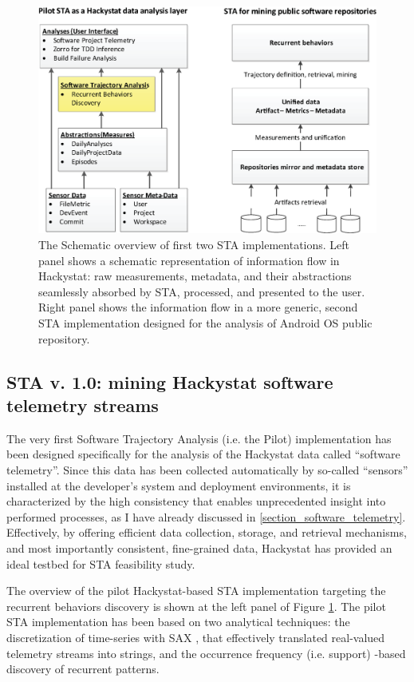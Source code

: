 \begin{figure}[t]
   \centering
   \includegraphics[width=150mm]{figures/STA12-schema-draft.eps}
   \caption{The Schematic overview of first two STA implementations. 
   Left panel shows a schematic representation of information flow in Hackystat: raw measurements, metadata, 
   and their abstractions seamlessly absorbed by STA, processed, and presented to the user.
   Right panel shows the information flow in a more generic, second STA implementation designed for the 
   analysis of Android OS public repository.}
   \label{fig:STA12-schema}
\end{figure}

\subsection{STA v. 1.0: mining Hackystat software telemetry streams}
The very first Software Trajectory Analysis (i.e. the Pilot) implementation has been designed specifically for the analysis 
of the Hackystat data called ``software telemetry''. Since this data has been collected automatically by so-called 
``sensors'' installed at the developer's system and deployment environments, it is characterized by the high consistency  
that enables unprecedented insight into performed processes, as I have already discussed in \ref{section_software_telemetry}. 
Effectively, by offering efficient data collection, storage, and retrieval mechanisms, and most importantly consistent, 
fine-grained data, Hackystat has provided an ideal testbed for STA feasibility study.

The overview of the pilot Hackystat-based STA implementation targeting the recurrent behaviors discovery is shown 
at the left panel of Figure  \ref{fig:STA12-schema}.
The pilot STA implementation has been based on two analytical techniques: the discretization of time-series with SAX \cite{sax}, 
that effectively translated real-valued telemetry streams into strings, and the occurrence frequency (i.e. support) -based 
discovery of recurrent patterns.

